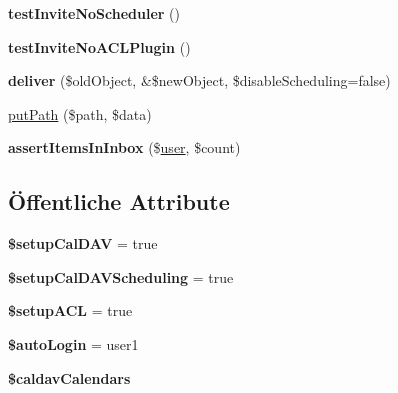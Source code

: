 \begin{DoxyCompactItemize}
{\bfseries test\+Invite\+No\+Scheduler} ()
\item 
\mbox{\label{class_sabre_1_1_cal_d_a_v_1_1_schedule_1_1_schedule_deliver_test_a2454ab2848a15011abfb822cfb856d3c}} 
{\bfseries test\+Invite\+No\+A\+C\+L\+Plugin} ()
\item 
\mbox{\label{class_sabre_1_1_cal_d_a_v_1_1_schedule_1_1_schedule_deliver_test_a8ff5a221b7eac37561606e83ec4022ac}} 
{\bfseries deliver} (\$old\+Object, \&\$new\+Object, \$disable\+Scheduling=false)
\item 
\mbox{\hyperlink{class_sabre_1_1_cal_d_a_v_1_1_schedule_1_1_schedule_deliver_test_a8e698a592d8c9853ec1af8acad65b2d5}{put\+Path}} (\$path, \$data)
\item 
\mbox{\label{class_sabre_1_1_cal_d_a_v_1_1_schedule_1_1_schedule_deliver_test_aa35ec811035378abe3495162c95a0fc3}} 
{\bfseries assert\+Items\+In\+Inbox} (\$\mbox{\hyperlink{classuser}{user}}, \$count)
\end{DoxyCompactItemize}
\subsection*{Öffentliche Attribute}
\begin{DoxyCompactItemize}
\item 
\mbox{\label{class_sabre_1_1_cal_d_a_v_1_1_schedule_1_1_schedule_deliver_test_a990f51d70db7584615a0cc214172fd18}} 
{\bfseries \$setup\+Cal\+D\+AV} = true
\item 
\mbox{\label{class_sabre_1_1_cal_d_a_v_1_1_schedule_1_1_schedule_deliver_test_ad42d344418b94b7a21777b0b1046005c}} 
{\bfseries \$setup\+Cal\+D\+A\+V\+Scheduling} = true
\item 
\mbox{\label{class_sabre_1_1_cal_d_a_v_1_1_schedule_1_1_schedule_deliver_test_a81bd2f76a100e71f4a89106de165eb30}} 
{\bfseries \$setup\+A\+CL} = true
\item 
\mbox{\label{class_sabre_1_1_cal_d_a_v_1_1_schedule_1_1_schedule_deliver_test_a08be126f00eea7daf3cc7a89ded322d3}} 
{\bfseries \$auto\+Login} = \textquotesingle{}user1\textquotesingle{}
\item 
{\bfseries \$caldav\+Calendars}
\end{DoxyCompactItemize}

